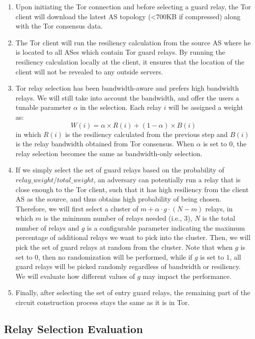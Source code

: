 \begin{enumerate}
\item Upon initiating the Tor connection and before selecting a guard relay, the Tor client will download the latest AS topology (<700KB if compressed) along with the Tor consensus data.
\item The Tor client will run the resiliency calculation from the source AS where he is located to all ASes which contain Tor guard relays. By running the resiliency calculation locally at the client, it ensures that the location of the client will not be revealed to any outside servers. 
\item Tor relay selection has been bandwidth-aware and prefers high bandwidth relays. We will still take into account the bandwidth, and offer the users a tunable parameter $\alpha$ in the selection. Each relay $i$ will be assigned a weight as:
\begin{equation*}
W(i) = \alpha \times R(i) + (1 - \alpha) \times B(i)
\end{equation*}
in which $R(i)$ is the resiliency calculated from the previous step and $B(i)$ is the relay bandwidth obtained from Tor consensus. When $\alpha$ is set to $0$, the relay selection becomes the same as bandwidth-only selection. 
\item If we simply select the set of guard relays based on the probability of $relay\_weight/total\_weight$, an adversary can potentially run a relay that is close enough to the Tor client, such that it has high resiliency from the client AS as the source, and thus obtains high probability of being chosen. Therefore, we will first select a cluster of $m + \alpha \cdot g \cdot (N - m)$ relays, in which $m$ is the minimum number of relays needed (i.e., 3), $N$ is the total number of relays and $g$ is a configurable parameter indicating the maximum percentage of additional relays we want to pick into the cluster. Then, we will pick the set of guard relays at random from the cluster. Note that when $g$ is set to $0$, then no randomization will be performed, while if $g$ is set to $1$, all guard relays will be picked randomly regardless of bandwidth or resiliency. We will evaluate how different values of $g$ may impact the performance. 
\item Finally, after selecting the set of entry guard relays, the remaining part of the circuit construction process stays the same as it is in Tor. 
\end{enumerate}

\subsection{Relay Selection Evaluation}

